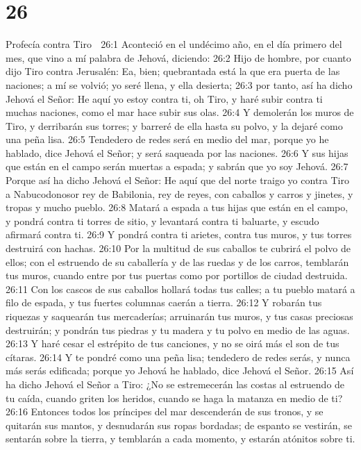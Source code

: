 \chapter{26}

Profecía contra Tiro  

26:1 Aconteció en el undécimo año, en el día primero del mes, que vino a mí palabra de Jehová, diciendo:  
26:2 Hijo de hombre, por cuanto dijo Tiro contra Jerusalén: Ea, bien; quebrantada está la que era puerta de las naciones; a mí se volvió; yo seré llena, y ella desierta;  
26:3 por tanto, así ha dicho Jehová el Señor: He aquí yo estoy contra ti, oh Tiro, y haré subir contra ti muchas naciones, como el mar hace subir sus olas.  
26:4 Y demolerán los muros de Tiro, y derribarán sus torres; y barreré de ella hasta su polvo, y la dejaré como una peña lisa.  
26:5 Tendedero de redes será en medio del mar, porque yo he hablado, dice Jehová el Señor; y será saqueada por las naciones.  
26:6 Y sus hijas que están en el campo serán muertas a espada; y sabrán que yo soy Jehová.  
26:7 Porque así ha dicho Jehová el Señor: He aquí que del norte traigo yo contra Tiro a Nabucodonosor rey de Babilonia, rey de reyes, con caballos y carros y jinetes, y tropas y mucho pueblo.  
26:8 Matará a espada a tus hijas que están en el campo, y pondrá contra ti torres de sitio, y levantará contra ti baluarte, y escudo afirmará contra ti.  
26:9 Y pondrá contra ti arietes, contra tus muros, y tus torres destruirá con hachas.  
26:10 Por la multitud de sus caballos te cubrirá el polvo de ellos; con el estruendo de su caballería y de las ruedas y de los carros, temblarán tus muros, cuando entre por tus puertas como por portillos de ciudad destruida.  
26:11 Con los cascos de sus caballos hollará todas tus calles; a tu pueblo matará a filo de espada, y tus fuertes columnas caerán a tierra.  
26:12 Y robarán tus riquezas y saquearán tus mercaderías; arruinarán tus muros, y tus casas preciosas destruirán; y pondrán tus piedras y tu madera y tu polvo en medio de las aguas.  
26:13 Y haré cesar el estrépito de tus canciones, y no se oirá más el son de tus cítaras. 
26:14 Y te pondré como una peña lisa; tendedero de redes serás, y nunca más serás edificada; porque yo Jehová he hablado, dice Jehová el Señor.  
26:15 Así ha dicho Jehová el Señor a Tiro: ¿No se estremecerán las costas al estruendo de tu caída, cuando griten los heridos, cuando se haga la matanza en medio de ti?  
26:16 Entonces todos los príncipes del mar descenderán de sus tronos, y se quitarán sus mantos, y desnudarán sus ropas bordadas; de espanto se vestirán, se sentarán sobre la tierra, y temblarán a cada momento, y estarán atónitos sobre ti.  
